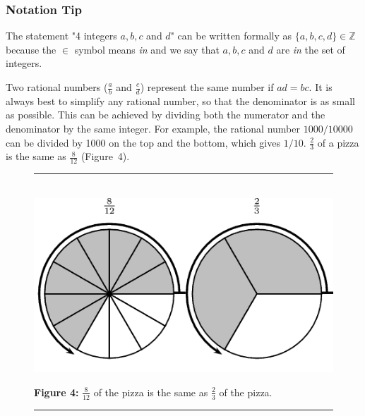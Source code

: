             \subsubsection{  Notation Tip }
            \nopagebreak
        \label{m38346*id179027}The statement "4 integers $a,b,c$ and $d$" can be
written formally as $\{a,b,c,d\}\in \mathbb{Z}$ because the $\in $ symbol means
\textsl{in} and we say that $a,b,c$ and $d$ are \textsl{in} the set of
integers. \par 
        \label{m38346*id179148}Two rational numbers ($\frac{a}{b}$ and $\frac{c}{d}$) represent the same number if $ad=bc$. It is always best to simplify any rational number, so that the
denominator is as small as possible. This can be achieved by dividing both the numerator and the denominator by the same integer. For example, the rational number $1000/10000$ can be divided by 1000 on the top and the bottom, which gives $1/10$. $\frac{2}{3}$ of a pizza is the same as $\frac{8}{12}$ (Figure~4).\par 
    \setcounter{subfigure}{0}
	\begin{figure}[H] %
    \begin{center}
    \rule[.1in]{\figurerulewidth}{.005in} \\
        \label{m38346*uid62!!!underscore!!!media}\label{m38346*uid62!!!underscore!!!printimage}\includegraphics{col11306.imgs/m38346_MG10C2_004.png} %
      \vspace{2pt}
    \vspace{\rubberspace}\par \begin{cnxcaption}
	  \small \textbf{Figure 4: }$\frac{8}{12}$ of the pizza is the same as $\frac{2}{3}$ of the pizza.
	\end{cnxcaption}
    \vspace{.1in}
    \rule[.1in]{\figurerulewidth}{.005in} \\
    \end{center}
 \end{figure}       
